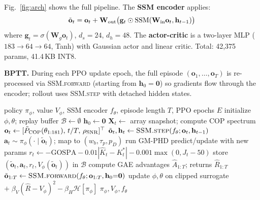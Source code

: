 \documentclass[journal]{IEEEtran}
\def\mat#1{\mathbf{#1}}
\def\vec#1{\mathbf{#1}}
\begin{document}
Fig.~\ref{fig:arch} shows the full pipeline.
The \textbf{SSM encoder} applies:
\begin{equation}
  \tilde{\vec{o}}_t = \vec{o}_t +
  \mat{W}_{\rm out}\bigl(\vec{g}_t \odot \mathrm{SSM}(
  \mat{W}_{\rm in}\vec{o}_t, \vec{h}_{t-1})\bigr)
  \label{eq:encoder}
\end{equation}
where $\vec{g}_t = \sigma(\mat{W}_g \vec{o}_t)$, $d_s{=}24$, $d_h{=}48$.
The \textbf{actor-critic} is a two-layer MLP
($183{\to}64{\to}64$, Tanh) with Gaussian actor and linear critic.
Total: 42,375 params, 41.4\,KB INT8.

\textbf{BPTT.}
During each PPO \cite{schulman2017proximal} update epoch, the full episode
$(\vec{o}_1,\ldots,\vec{o}_T)$ is re-processed via \textsc{SSM.forward}
(starting from $\vec{h}_0{=}\vec{0}$) so gradients flow through the encoder;
rollout uses \textsc{SSM.step} with detached hidden states.

\begin{algorithm}[t]
\caption{Mamba-COP-RL: rollout + PPO update}
\label{alg:mamba_cop_rl}
\small
\begin{algorithmic}[1]
\Require policy $\pi_\phi$, value $V_\phi$, SSM encoder $f_\theta$,
         episode length $T$, PPO epochs $E$
\State initialize $\phi,\theta$; replay buffer $\mathcal{B}\gets\emptyset$
  \State $\vec{h}_0 \gets \vec{0}$
   
    \State $\mat{X}_t \gets$ array snapshot; compute COP spectrum
    \State $\vec{o}_t \gets [\tilde{P}_{\rm COP}(\theta_{1:181}),\,t/T,\,\rho_{\rm SNR}]^\top$
    \State $\tilde{\vec{o}}_t,\vec{h}_t \gets \textsc{SSM.step}(f_\theta; \vec{o}_t, \vec{h}_{t-1})$ 
    \State $\vec{a}_t \sim \pi_\phi(\cdot \mid \tilde{\vec{o}}_t)$;
           map to $(w_b,\tau_p,p_D)$
    \State run GM-PHD predict/update with new params
    \State $r_t \gets -\mathrm{GOSPA}
           -0.01|\hat K_t-K_t^*|
           -0.001\max(0,J_t-50)$
    \State store $(\tilde{\vec{o}}_t,\vec{a}_t,r_t,V_\phi(\tilde{\vec{o}}_t))$ in $\mathcal{B}$
  \EndFor
  \State compute GAE advantages $\hat A_{1:T}$; returns $\hat R_{1:T}$
   
    \State $\tilde{\vec{o}}_{1:T} \gets \textsc{SSM.forward}(f_\theta; \vec{o}_{1:T}, \vec{h}_0{=}\vec{0})$
    \State update $\phi,\theta$ on clipped surrogate
           $+\;\beta_V(\hat R-V_\phi)^2 - \beta_H\mathcal{H}[\pi_\phi]$
  \EndFor
\EndFor
\State \Return $\pi_\phi, V_\phi, f_\theta$
\end{algorithmic}
\end{algorithm}
\end{document}

